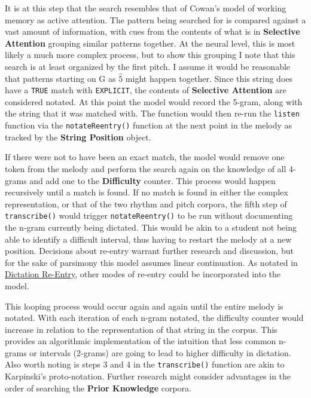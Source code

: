 \documentclass[12pt,]{book}
\begin{document}
It is at this step that the search resembles that of Cowan's model of working memory as active attention.
The pattern being searched for is compared against a vast amount of information, with cues from the contents of what is in \textbf{Selective Attention} grouping similar patterns together.
At the neural level, this is most likely a much more complex process, but to show this grouping I note that this search is at least organized by the first pitch.
I assume it would be reasonable that patterns starting on G as \(\hat{5}\) might happen together.
Since this string does have a \texttt{TRUE} match with \texttt{EXPLICIT}, the contents of \textbf{Selective Attention} are considered notated.
At this point the model would record the 5-gram, along with the string that it was matched with.
The function would then re-run the \texttt{listen} function via the \texttt{notateReentry()} function at the next point in the melody as tracked by the \textbf{String Position} object.

If there were not to have been an exact match, the model would remove one token from the melody and perform the search again on the knowledge of all 4-grams and add one to the \textbf{Difficulty} counter.
This process would happen recursively until a match is found.
If no match is found in either the complex representation, or that of the two rhythm and pitch corpora, the fifth step of \texttt{transcribe()} would trigger \texttt{notateReentry()} to be run without documenting the n-gram currently being dictated.
This would be akin to a student not being able to identify a difficult interval, thus having to restart the melody at a new position.
Decisions about re-entry warrant further research and discussion, but for the sake of parsimony this model assumes linear continuation.
As notated in \protect\hyperlink{dictation-re-entry}{Dictation Re-Entry}, other modes of re-entry could be incorporated into the model.

This looping process would occur again and again until the entire melody is notated.
With each iteration of each n-gram notated, the difficulty counter would increase in relation to the representation of that string in the corpus.
This provides an algorithmic implementation of the intuition that less common n-grams or intervals (2-grams) are going to lead to higher difficulty in dictation.
Also worth noting is steps 3 and 4 in the \texttt{transcribe()} function are akin to Karpinski's proto-notation.
Further research might consider advantages in the order of searching the \textbf{Prior Knowledge} corpora.
\end{document}
